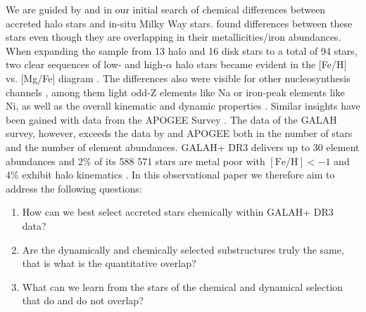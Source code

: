 \documentclass[fleqn,usenatbib]{mnras}
\begin{document}
We are guided by \citet{Nissen1997b, Nissen2010, Nissen2011} and \citet{Nissen2014} in our initial search of chemical differences between accreted halo stars and in-situ Milky Way stars. \citet{Nissen1997b} found differences between these stars even though they are overlapping in their metallicities/iron abundances. When expanding the sample from 13 halo and 16 disk stars to a total of 94 stars, two clear sequences of low- and high-$\alpha$ halo stars became evident in the [Fe/H] vs. [Mg/Fe] diagram \citep{Nissen2010}. The differences also were visible for other nucleosynthesis channels \citep{Nissen2010, Nissen2011}, among them light odd-Z elements like Na or iron-peak elements like Ni, as well as the overall kinematic and dynamic properties \citep{Nissen2010, Schuster2012}. Similar insights have been gained with data from the APOGEE Survey \citep{Hawkins2015, Hayes2018, Das2020}. The data of the GALAH survey, however, exceeds the data by \citet{Nissen2010} and APOGEE both in the number of stars and the number of element abundances. GALAH+ DR3 delivers up to 30 element abundances and 2\% of its 588 571 stars are metal poor with $\mathrm{[Fe/H]} < -1$ and 4\% exhibit halo kinematics \citep{Buder2021}. In this observational paper we therefore aim to address the following questions:
\begin{enumerate}
\item How can we best select accreted stars chemically within GALAH+ DR3 data?
\item Are the dynamically and chemically selected substructures truly the same, that is what is the quantitative overlap?
\item What can we learn from the stars of the chemical and dynamical selection that do and do not overlap?
\end{enumerate}
\end{document}

